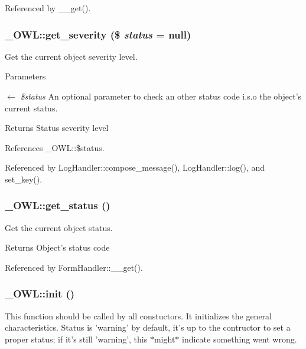 Referenced by \_\-\_\-get().

\subsubsection[{get\_\-severity}]{\setlength{\rightskip}{0pt plus 5cm}\_\-OWL::get\_\-severity (\$ {\em status} = {\ttfamily null})}\label{class__OWL_adf9509ef96858be7bdd9414c5ef129aa}
Get the current object severity level.


\begin{DoxyParams}{Parameters}
\item[\mbox{$\leftarrow$} {\em \$status}]An optional parameter to check an other status code i.s.o the object's current status. \end{DoxyParams}
\begin{DoxyReturn}{Returns}
Status severity level 
\end{DoxyReturn}


References \_\-OWL::\$status.



Referenced by LogHandler::compose\_\-message(), LogHandler::log(), and set\_\-key().

\subsubsection[{get\_\-status}]{\setlength{\rightskip}{0pt plus 5cm}\_\-OWL::get\_\-status ()}\label{class__OWL_a99ec771fa2c5c279f80152cc09e489a8}
Get the current object status.

\begin{DoxyReturn}{Returns}
Object's status code 
\end{DoxyReturn}


Referenced by FormHandler::\_\-\_\-get().

\subsubsection[{init}]{\setlength{\rightskip}{0pt plus 5cm}\_\-OWL::init ()}\label{class__OWL_ae0ef3ded56e8a6b34b6461e5a721cd3e}
This function should be called by all constuctors. It initializes the general characteristics. Status is 'warning' by default, it's up to the contructor to set a proper status; if it's still 'warning', this $\ast$might$\ast$ indicate something went wrong. 

